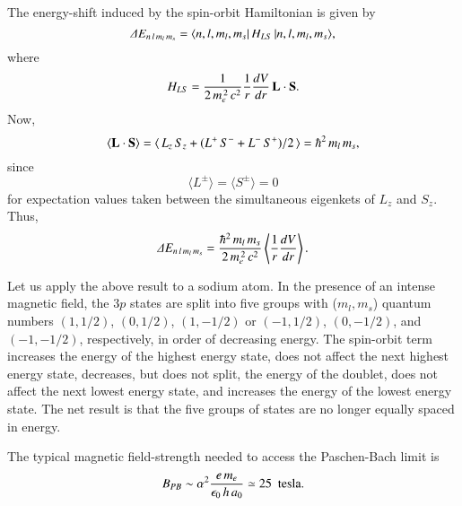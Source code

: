 The energy-shift induced by the spin-orbit Hamiltonian is
given by
\begin{equation}
{\mit\Delta} E_{n\,l\,m_l \,m_s} = \langle  n,l,m_l, m_s|\,H_{LS}\,| n,l,m_l, m_s\rangle,
\end{equation}
where
\begin{equation}
H_{LS} = \frac{1}{2 \,m_e^{\,2}\,c^2} \frac{1}{r} \frac{dV}{dr} \,{\bf L}\cdot
 {\bf S}.
\end{equation}
Now,
\begin{equation}
\langle {\bf L}\cdot {\bf S}\rangle = \langle\, L_z \,S_z + (L^+\, S^- 
+ L^- \,S^+)/2\,
\rangle= \hbar^2\, m_l\, m_s,
\end{equation}
since
\begin{equation}
\langle L^\pm \rangle = \langle S^\pm\rangle = 0
\end{equation}
for expectation values taken between the simultaneous eigenkets of
$L_z$ and $S_z$. 
Thus,
\begin{equation}
{\mit\Delta} E_{n\,l\, m_l\, m_s} = \frac{\hbar^2\, m_l \,m_s}
{2 \,m_e^{\,2}\,c^2} \left\langle \frac{1}{r} \frac{d V}{dr}\right\rangle.
\end{equation}

Let us apply the above result to a sodium atom. In the presence of
an intense magnetic field, the $3p$ states are split into five
groups with ($m_l,m_s$) quantum numbers $(1,1/2)$, $(0,1/2)$, $(1,-1/2)$
or $(-1, 1/2)$, $(0,-1/2)$, and $(-1,-1/2)$, respectively, in order of
decreasing energy. The spin-orbit term increases the energy of
the highest energy state, does not affect the next highest energy state,
decreases, but does not split, the energy of the doublet, does
not affect the next lowest energy state, and increases 
the energy of the lowest
energy state. The net result is that the five groups of states are no
longer equally spaced in energy. 

The typical magnetic field-strength needed to access the Paschen-Bach limit
is 
\begin{equation}
B_{PB} \sim \alpha^2 \frac{e\, m_e}{\epsilon_0\, h \,a_0} 
\simeq 25\,\,\,{\rm tesla}.
\end{equation}

